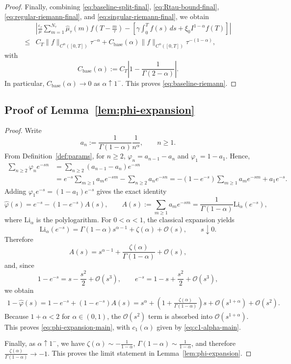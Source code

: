 \documentclass[letterpaper]{article}
\numberwithin{equation}{section}
\theoremstyle{definition}
\theoremstyle{remark}
\begin{document}
\begin{proof}
Finally, combining \eqref{eq:baseline-split-final}, \eqref{eq:Rtau-bound-final},
\eqref{eq:regular-riemann-final}, and \eqref{eq:singular-riemann-final}, we obtain
\begin{align*}
  &\left|
    \frac{\varepsilon_\tau}{\mu}
    \sum_{m=1}^{N_\tau}\hat\mu_\tau(m)
    f\!\left(T-\frac{m}{\tau}\right)
    -
    \left[
      \gamma\int_0^T f(s)\,ds
      +
      \xi_0 I^{1-\alpha}f(T)
    \right]
  \right|\\
  \le&
  C_T\|f\|_{C^{\alpha}([0,T])}\tau^{-\alpha}
  +
  C_{\mathrm{base}}(\alpha)\|f\|_{C^{\alpha}([0,T])}\tau^{-(1-\alpha)},
\end{align*}
with
\[
  C_{\mathrm{base}}(\alpha)
  :=
  C_T\left|1-\frac{1}{\Gamma(2-\alpha)}\right|.
\]
In particular,
$C_{\mathrm{base}}(\alpha)\to0$
as $\alpha\uparrow1^-$.
This proves \eqref{eq:baseline-riemann}.
\end{proof}
\subsection{Proof of Lemma~\ref{lem:phi-expansion}}\label{app:phi-expansion}

\begin{proof}
Write
\[
  a_n:=\frac{1}{\Gamma(1-\alpha)}\frac{1}{n^\alpha},
  \qquad n\ge1.
\]
From Definition~\ref{def:params}, for $n\ge2$,
$\varphi_n=a_{n-1}-a_n$
and $\varphi_1=1-a_1$. Hence,
\begin{align*}
\sum_{n\ge2}\varphi_n e^{-sn}
&=
\sum_{n\ge2}(a_{n-1}-a_n)e^{-sn}\\
&=
e^{-s}\sum_{m\ge1}a_m e^{-sm}-\sum_{n\ge2}a_n e^{-sn}
=
-\left(1-e^{-s}\right)\sum_{m\ge1}a_m e^{-sm}+a_1 e^{-s}.
\end{align*}
Adding $\varphi_1 e^{-s}=(1-a_1)e^{-s}$ gives the exact identity
\[
\hat\varphi(s)
=
e^{-s}-\left(1-e^{-s}\right)A(s),
\qquad
A(s):=\sum_{m\ge1}a_m e^{-sm}
=
\frac{1}{\Gamma(1-\alpha)}\mathrm{Li}_\alpha(e^{-s}),
\]
where $\mathrm{Li}_\alpha$ is the polylogarithm. For $0<\alpha<1$, the classical expansion
\cite{DLMF} yields
\[
\mathrm{Li}_\alpha(e^{-s})
=
\Gamma(1-\alpha)s^{\alpha-1}+\zeta(\alpha)+\mathcal O(s),
\qquad s\downarrow0.
\]
Therefore
\[
A(s)
=
s^{\alpha-1}+\frac{\zeta(\alpha)}{\Gamma(1-\alpha)}+\mathcal O(s),
\]
and, since
\[
1-e^{-s}=s-\frac{s^2}{2}+\mathcal O(s^3),
\qquad
e^{-s}=1-s+\frac{s^2}{2}+\mathcal O(s^3),
\]
we obtain
\begin{align*}
  1-\hat\varphi(s)
  =
  1-e^{-s}+\left(1-e^{-s}\right)A(s)
  =
  s^\alpha
  +\left(1+\frac{\zeta(\alpha)}{\Gamma(1-\alpha)}\right)s
  +\mathcal O(s^{1+\alpha})+\mathcal O(s^2).
\end{align*}
Because $1+\alpha<2$ for $\alpha\in(0,1)$, the $\mathcal O(s^2)$ term is absorbed into $\mathcal O(s^{1+\alpha})$. This proves \eqref{eq:phi-expansion-main}, with $c_1(\alpha)$ given by \eqref{eq:c1-alpha-main}.

Finally, as $\alpha\uparrow1^-$, we have
$\zeta(\alpha)\sim -\frac{1}{1-\alpha}$,
$\Gamma(1-\alpha)\sim \frac{1}{1-\alpha}$,
and therefore
$\frac{\zeta(\alpha)}{\Gamma(1-\alpha)}\to-1$.
This proves the limit statement in Lemma~\ref{lem:phi-expansion}.
\end{proof}
\end{document}

